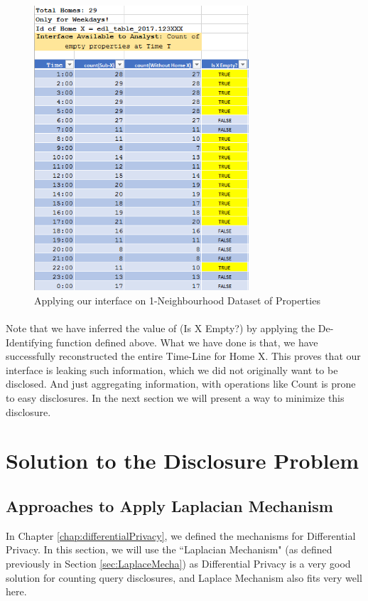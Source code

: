 \documentclass[12pt]{report}
\theoremstyle{named}
\begin{document}
\begin{figure}[ht]
\centering
        \includegraphics[width=80mm,scale=1]{Images/1NeighbourhoodAttack.PNG}
    \caption{Applying our interface on 1-Neighbourhood Dataset of Properties}
    \label{fig:1NeighAttack}
\end{figure}
\paragraph{}
Note that we have inferred the value of (Is X Empty?) by applying the De-Identifying function defined above. What we have done is that, we have successfully reconstructed the entire Time-Line for Home X. This proves that our interface is leaking such information, which we did not originally want to be disclosed. And just aggregating information, with operations like Count is prone to easy disclosures. In the next section we will present a way to minimize this disclosure.

\section{Solution to the Disclosure Problem}
\subsection{Approaches to Apply Laplacian Mechanism}
In Chapter \ref{chap:differentialPrivacy}, we defined the mechanisms for Differential Privacy. In this section, we will  use the ``Laplacian Mechanism" (as defined previously in Section \ref{sec:LaplaceMecha}) as Differential Privacy is a very good solution for counting query disclosures, and Laplace Mechanism also fits very well here.
\end{document}
